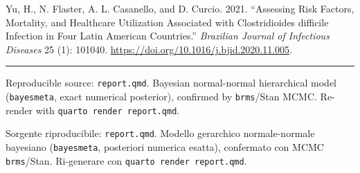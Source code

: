 \documentclass[
  letterpaper,
  DIV=11,
  numbers=noendperiod]{scrartcl}
\newlength{\cslhangindent}
\newenvironment{CSLReferences}[2] %
 {\begin{list}{}{%
  \setlength{\itemindent}{0pt}
  \setlength{\leftmargin}{0pt}
  \setlength{\parsep}{0pt}
  \ifodd #1
   \setlength{\leftmargin}{\cslhangindent}
   \setlength{\itemindent}{-1\cslhangindent}
  \fi
  \setlength{\itemsep}{#2\baselineskip}}}
 {\end{list}}
\begin{document}
\begin{CSLReferences}{1}{1}
Yu, H., N. Flaster, A. L. Casanello, and D. Curcio. 2021. {``Assessing
Risk Factors, Mortality, and Healthcare Utilization Associated with
{Clostridioides difficile} Infection in Four {Latin American}
Countries.''} \emph{Brazilian Journal of Infectious Diseases} 25 (1):
101040. \url{https://doi.org/10.1016/j.bjid.2020.11.005}.

\end{CSLReferences}

\begin{center}\rule{0.5\linewidth}{0.5pt}\end{center}

Reproducible source: \texttt{report.qmd}. Bayesian normal-normal
hierarchical model (\texttt{bayesmeta}, exact numerical posterior),
confirmed by \texttt{brms}/Stan MCMC. Re-render with
\texttt{quarto\ render\ report.qmd}.

Sorgente riproducibile: \texttt{report.qmd}. Modello gerarchico
normale-normale bayesiano (\texttt{bayesmeta}, posteriori numerica
esatta), confermato con MCMC \texttt{brms}/Stan. Ri-generare con
\texttt{quarto\ render\ report.qmd}.
\end{document}
